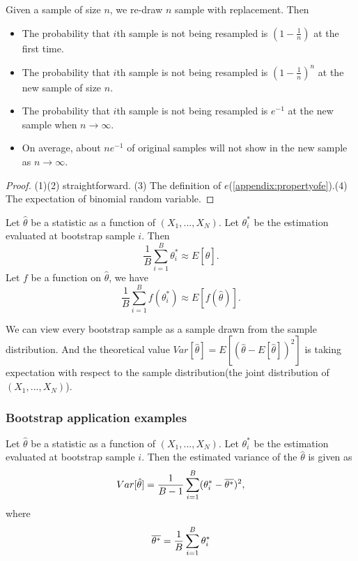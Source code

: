 \begin{refsection}
\begin{lemma}\label{ch:theory-of-statistics:th:resamplingproperty}
Given a sample of size $n$, we re-draw $n$ sample with replacement. Then
\begin{itemize}
	\item The probability that $i$th sample is not being resampled is $(1-\frac{1}{n})$ at the first time. 
	\item The probability that $i$th sample is not being resampled is $(1-\frac{1}{n})^n$ at the new sample of size $n$.
	\item The probability that $i$th sample is not being resampled is $e^{-1}$ at the new sample when $n\to \infty$.
	\item On average, about $ne^{-1}$ of original samples will not show in the new sample as $n\to \infty$. 
\end{itemize}
\end{lemma}
\begin{proof}
(1)(2) straightforward. (3) The definition of $e$(\autoref{appendix:propertyofe}).(4) The expectation of binomial random variable.
\end{proof}


\begin{definition}
Let $\hat{\theta}$ be a statistic as a function of $(X_1,...,X_N)$. Let $\theta^*_i$ be the estimation evaluated at bootstrap sample $i$.
Then
$$\frac{1}{B}\sum_{i=1}^B \theta^*_i \approx E[\hat{\theta}].$$
Let $f$ be a function on $\hat{\theta}$, we have
$$\frac{1}{B}\sum_{i=1}^B f(\theta^*_i) \approx E[f(\hat{\theta})].$$
\end{definition}

\begin{remark}
	We can view every bootstrap sample as a sample drawn from the sample distribution. And the theoretical value $Var[\hat{\theta}] = E[(\hat{\theta} - E[\hat{\theta}])^2]$ is taking expectation with respect to the sample distribution(the joint distribution of $(X_1,...,X_N)$).
\end{remark}


\subsubsection{Bootstrap application examples}


\begin{definition}
	Let $\hat{\theta}$ be a statistic as a function of $(X_1,...,X_N)$. Let $\theta^*_i$ be the estimation evaluated at bootstrap sample $i$. Then
	the estimated variance of the $\hat{\theta}$ is given as
	$$Var[\hat{\theta}] = \frac{1}{B-1}\sum_{i=1}^B (\theta^*_i - \overline{\theta^*})^2,$$
	where
	$$\overline{\theta^*}=\frac{1}{B}\sum_{i=1}^B \theta^*_i$$ 
\end{definition}


\end{refsection}
